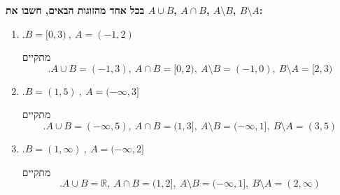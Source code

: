 \textbf{בכל אחד מהזוגות הבאים, חשבו את
$A\cup B$, $A\cap B$, $A\setminus B$, $B\setminus A$:}
\begin{enumerate}
\item $.B=[0,3)\ ,\ A=(-1,2)$
\begin{solbox}
מתקיים
$$.A\cup B=(-1,3),\ A\cap B=[0,2),\ A\setminus B=(-1,0),\ B\setminus A=[2,3)$$
\end{solbox}
\item $.B=(1,5)\ ,\ A=(-\infty,3]$
\begin{solbox}
מתקיים
$$.A\cup B=(-\infty,5),\ A\cap B=(1,3],\ A\setminus B=(-\infty,1],\ B\setminus A=(3,5)$$
\end{solbox}
\item $.B=(1,\infty)\ ,\ A=(-\infty,2]$
\begin{solbox}
מתקיים
$$.A\cup B=\mathbb{R},\ A\cap B=(1,2],\ A\setminus B=(-\infty,1],\ B\setminus A=(2,\infty)$$
\end{solbox}
\eMs
\end{enumerate}
